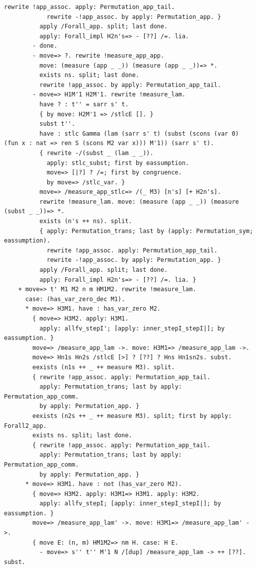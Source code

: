 \begin{lstlisting}[style=authorcoq]
            rewrite !app_assoc. apply: Permutation_app_tail.
            rewrite -!app_assoc. by apply: Permutation_app. }
          apply /Forall_app. split; last done.
          apply: Forall_impl H2n's=> - [??] /=. lia.
        - done.
        - move=> ?. rewrite !measure_app_app.
          move: (measure (app _ _)) (measure (app _ _))=> *.
          exists ns. split; last done.
          rewrite !app_assoc. by apply: Permutation_app_tail.
        - move=> H1M'1 H2M'1. rewrite !measure_lam.
          have ? : t'' = sarr s' t.
          { by move: H2M'1 => /stlcE []. }
          subst t''.
          have : stlc Gamma (lam (sarr s' t) (subst (scons (var 0) (fun x : nat => ren S (scons M2 var x))) M'1)) (sarr s' t).
          { rewrite -/(subst _ (lam _ _)).
            apply: stlc_subst; first by eassumption.
            move=> [|?] ? /=; first by congruence.
            by move=> /stlc_var. }
          move=> /measure_app_stlc=> /(_ M3) [n's] [+ H2n's].
          rewrite !measure_lam. move: (measure (app _ _)) (measure (subst _ _))=> *.
          exists (n's ++ ns). split.
          { apply: Permutation_trans; last by (apply: Permutation_sym; eassumption).
            rewrite !app_assoc. apply: Permutation_app_tail.
            rewrite -!app_assoc. by apply: Permutation_app. }
          apply /Forall_app. split; last done.
          apply: Forall_impl H2n's=> - [??] /=. lia. }
    + move=> t' M1 M2 n m HM1M2. rewrite !measure_lam.
      case: (has_var_zero_dec M1).
      * move=> H3M1. have : has_var_zero M2.
        { move=> H3M2. apply: H3M1.
          apply: allfv_stepI'; [apply: inner_stepI_stepI|]; by eassumption. }
        move=> /measure_app_lam ->. move: H3M1=> /measure_app_lam ->.
        move=> Hn1s Hn2s /stlcE [>] ? [??] ? Hns Hn1sn2s. subst.
        eexists (n1s ++ _ ++ measure M3). split.
        { rewrite !app_assoc. apply: Permutation_app_tail.
          apply: Permutation_trans; last by apply: Permutation_app_comm.
          by apply: Permutation_app. }
        eexists (n2s ++ _ ++ measure M3). split; first by apply: Forall2_app.
        exists ns. split; last done.
        { rewrite !app_assoc. apply: Permutation_app_tail.
          apply: Permutation_trans; last by apply: Permutation_app_comm.
          by apply: Permutation_app. }
      * move=> H3M1. have : not (has_var_zero M2).
        { move=> H3M2. apply: H3M1=> H3M1. apply: H3M2.
          apply: allfv_stepI; [apply: inner_stepI_stepI|]; by eassumption. }
        move=> /measure_app_lam' ->. move: H3M1=> /measure_app_lam' ->.
        { move E: (n, m) HM1M2=> nm H. case: H E.
          - move=> s'' t'' M'1 N /[dup] /measure_app_lam -> ++ [??]. subst.

\end{lstlisting}
